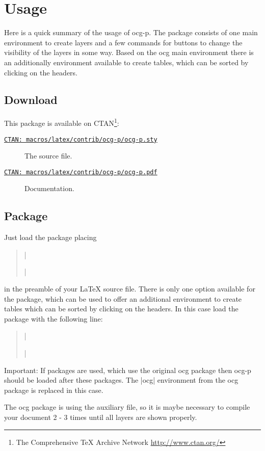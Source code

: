 \documentclass[a4paper]{ltxdoc}
\newcommand*{\pkg}[1]{\textsf{#1}}
\begin{document}
\section{Usage}
Here is a quick summary of the usage of \pkg{ocg-p}. The package consists of one main environment to create layers and a few commands for buttons to change the visibility of the layers in some way.
Based on the ocg main environment there is an additionally environment available to create tables, which can be sorted by clicking on the headers.

\subsection{Download}
This package is available on CTAN\footnote{The Comprehensive \TeX{} Archive Network \url{http://www.ctan.org/}}:
\begin{description}
\item[\href{ftp://ftp.ctan.org/tex-archive/macros/latex/contrib/ocg-p/ocg-p.sty}{\texttt{CTAN: macros/latex/contrib/ocg-p/ocg-p.sty}}] The source file.
\item[\href{ftp://ftp.ctan.org/tex-archive/macros/latex/contrib/ocg-p/ocg-p.pdf}{\texttt{CTAN: macros/latex/contrib/ocg-p/ocg-p.pdf}}] Documentation.
\end{description}

\subsection{Package}
Just load the package placing
\begin{quote}
   |\usepackage{ocg-p}|
 \end{quote}
in the preamble of your \LaTeX{}  source file. %
There is only one option available for the package, which can be used to offer an additional environment to create tables which can be sorted by clicking on the headers. In this case load the package with the following line:
\begin{quote}
   |\usepackage[ocgtabular]{ocg-p}|
 \end{quote}

Important: If packages are used, which use the original \pkg{ocg} package then \pkg{ocg-p} should be loaded after these packages. The |ocg| environment from the \pkg{ocg} package is replaced in this case.

The \pkg{ocg} package is using the auxiliary file, so it is maybe necessary to compile your document 2 - 3 times until all layers are shown properly.
\end{document}
